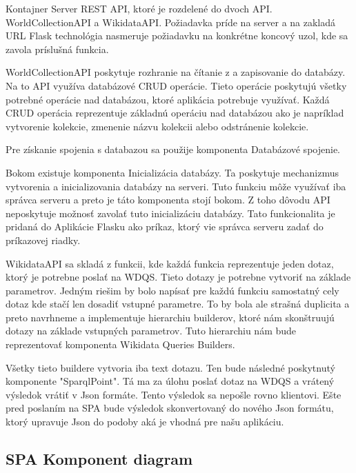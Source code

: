 Kontajner Server REST API, ktoré je rozdelené do dvoch API. WorldCollectionAPI a WikidataAPI.
Požiadavka príde na server a na zakladá URL Flask technológia
nasmeruje požiadavku na konkrétne koncový uzol, kde sa zavola príslušná funkcia.

WorldCollectionAPI poskytuje rozhranie na čítanie z a zapisovanie do databázy. Na to API využíva databázové CRUD operácie.
Tieto operácie poskytujú všetky potrebné operácie nad databázou, ktoré aplikácia potrebuje využívať.
Každá CRUD operácia reprezentuje základnú operáciu nad databázou ako je napríklad vytvorenie kolekcie, zmenenie názvu kolekcii alebo odstránenie kolekcie.

Pre získanie spojenia s databazou sa použije komponenta Databázové spojenie.

Bokom existuje komponenta Inicializácia databázy. Ta poskytuje mechanizmus vytvorenia a inicializovania databázy na serveri. Tuto funkciu môže využívať iba správca serveru a preto je táto komponenta stojí bokom.
Z toho dôvodu API neposkytuje možnosť zavolať tuto inicializáciu databázy. Tato funkcionalita je pridaná do Aplikácie Flasku ako príkaz, ktorý vie správca serveru zadať do príkazovej riadky.

WikidataAPI sa skladá z funkcii, kde každá funkcia reprezentuje jeden dotaz, ktorý je potrebne poslať na WDQS.
Tieto dotazy je potrebne vytvoriť na základe parametrov. Jedným riešim by bolo napísať pre každú funkciu samostatný
cely dotaz kde stačí len dosadiť vstupné parametre. To by bola ale strašná duplicita a preto navrhneme a implementuje hierarchiu builderov, ktoré
nám skonštruujú dotazy na základe vstupných parametrov. Tuto hierarchiu nám bude reprezentovať komponenta Wikidata Queries Builders.


Všetky tieto buildere vytvoria iba text dotazu. Ten bude následné poskytnutý komponente "SparqlPoint". Tá ma za úlohu poslať dotaz na WDQS a vrátený výsledok vrátiť v Json formáte. Tento výsledok
sa nepošle rovno klientovi. Ešte pred poslaním na SPA bude výsledok skonvertovaný do nového Json formátu, ktorý upravuje Json do podoby aká je vhodná pre našu aplikáciu.

\subsection{ SPA Komponent diagram}

